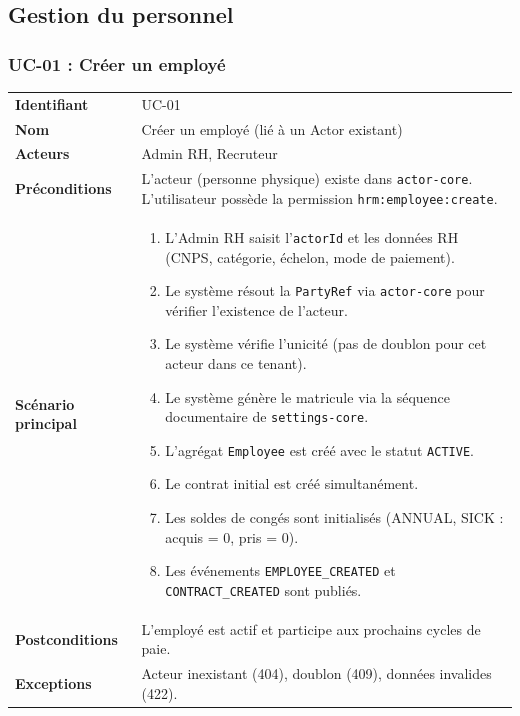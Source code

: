 \documentclass[a4paper,12pt,openany]{book}
\begin{document}
    \subsection{Gestion du personnel}

    \subsubsection*{UC-01 : Créer un employé}
    \begin{table}[H]
        \centering
        \begin{tabularx}{\textwidth}{lX}
    \toprule
    \textbf{Identifiant} & UC-01 \\
    \textbf{Nom}         & Créer un employé (lié à un Actor existant) \\
    \textbf{Acteurs}     & Admin RH, Recruteur \\
    \textbf{Préconditions} & L'acteur (personne physique) existe dans \texttt{actor-core}. L'utilisateur possède la permission \texttt{hrm:employee:create}. \\
    \midrule
    \textbf{Scénario principal} &
    \begin{enumerate}[nosep]
      \item L'Admin RH saisit l'\texttt{actorId} et les données RH (CNPS, catégorie, échelon, mode de paiement).
      \item Le système résout la \texttt{PartyRef} via \texttt{actor-core} pour vérifier l'existence de l'acteur.
      \item Le système vérifie l'unicité (pas de doublon pour cet acteur dans ce tenant).
      \item Le système génère le matricule via la séquence documentaire de \texttt{settings-core}.
      \item L'agrégat \texttt{Employee} est créé avec le statut \texttt{ACTIVE}.
      \item Le contrat initial est créé simultanément.
      \item Les soldes de congés sont initialisés (ANNUAL, SICK : acquis = 0, pris = 0).
      \item Les événements \texttt{EMPLOYEE\_CREATED} et \texttt{CONTRACT\_CREATED} sont publiés.
    \end{enumerate} \\
    \midrule
    \textbf{Postconditions} & L'employé est actif et participe aux prochains cycles de paie. \\
    \textbf{Exceptions} & Acteur inexistant (404), doublon (409), données invalides (422). \\
    \bottomrule
        \end{tabularx}
    \end{table}
\end{document}

